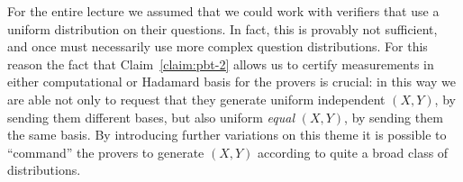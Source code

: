 \begin{remark}
For the entire lecture we assumed that we could work with verifiers that use a uniform distribution on their questions. In fact, this is provably not sufficient, and once must necessarily use more complex question distributions. For this reason the fact that Claim~\ref{claim:pbt-2} allows us to certify measurements in either computational or Hadamard basis for the provers is crucial: in this way we are able not only to request that they generate uniform independent $(X,Y)$, by sending them different bases, but also uniform \emph{equal} $(X,Y)$, by sending them the same basis. By introducing further variations on this theme it is possible to ``command'' the provers to generate $(X,Y)$ according to quite a broad class of distributions. 
\end{remark}

